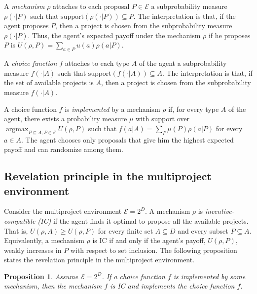 \documentclass[12pt,english]{article}
\newcommand{\cale}{\mathcal E}
\DeclareMathOperator*{\argmax}{argmax}
\newcommand{\support}{\text{support}}
\theoremstyle{remark}
\theoremstyle{plain}
\newtheorem{proposition}{Proposition}[section]
\theoremstyle{definition}
\begin{document}
A \emph{mechanism} $\rho$ attaches to each proposal $P\in \cale$ a subprobability measure $\rho(\cdot|P)$ such that $\support(\rho(\cdot|P))\subseteq P$. The interpretation is that, if the agent proposes $P$, then a project is chosen from the subprobability measure $\rho(\cdot|P)$. Thus, the agent's expected payoff under the mechanism $\rho$ if he proposes $P$ is $U(\rho,P)=\sum_{a\in P} u(a)\rho(a|P)$.


A \emph{choice function} $f$ attaches to each type $A$ of the agent a subprobability measure $f(\cdot|A)$ such that $\support(f(\cdot|A))\subseteq A$. The interpretation is that, if the set of available projects is $A$, then a project is chosen from the subprobability measure $f(\cdot|A)$. 

A choice function $f$ is \emph{implemented} by a mechanism $\rho$ if, for every type $A$ of the agent, there exists a probability measure $\mu$ with support over $\argmax_{P\subseteq A, P\in \cale} U(\rho,P)$ such that $f(a|A)=\sum_{P}\mu(P)\rho(a|P)$ for every $a\in A$. The agent chooses only proposals that give him the highest expected payoff and can randomize among them. 





\subsection{Revelation principle in the multiproject environment}

Consider the multiproject environment $\cale=2^D$. A mechanism $\rho$ is \emph{incentive-compatible (IC)} if the agent finds it optimal to propose all the available projects. That is, $U(\rho,A)\geqslant U(\rho,P)$ for every finite set $A\subseteq D$ and every subset $P \subseteq A$. Equivalently, a mechanism $\rho$ is IC if and only if the agent's payoff, $U(\rho,P)$, weakly increases in $P$ with respect to set inclusion. The following proposition states the revelation principle in the multiproject environment. 
\begin{proposition}\label{pr:revelation}
  Assume $\cale=2^D$. If a choice function $f$ is implemented by some mechanism, then the mechanism $f$ is IC and implements the choice function $f$.\end{proposition}
  
\end{document}
